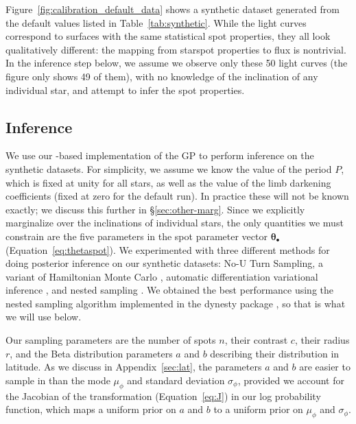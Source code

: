 \documentclass[modern,linenumbers]{aastex62}
\begin{document}
\vfill
\pagebreak

Figure~\ref{fig:calibration_default_data} shows a synthetic dataset generated
from the default values listed in Table~\ref{tab:synthetic}. While the
light curves correspond to surfaces with the same statistical spot properties,
they all look qualitatively different: the mapping from starspot properties
to flux is nontrivial. In the inference step below, we assume we observe
only these 50 light curves (the figure only shows 49 of them),
with no knowledge of the inclination of any individual
star, and attempt to infer the spot properties.

\subsection{Inference}
\label{sec:calibration-inference}
We use our \Python-based implementation of the GP \citep{JOSSPaper}
to perform inference on the synthetic datasets. For simplicity, we assume we
know the value of the period $P$, which is fixed at unity for all stars, as well
as the value of the limb darkening coefficients (fixed at zero for the default
run). In practice these will not be known exactly; we discuss this further in
\S\ref{sec:other-marg}. Since we explicitly marginalize over the inclinations
of individual stars, the only quantities we must constrain are the five
parameters in the spot parameter vector $\pmb{\theta}_\bullet$
(Equation~\ref{eq:thetaspot}). We experimented with three different methods
for doing posterior inference on our synthetic datasets: No-U Turn Sampling,
a variant of Hamiltonian Monte Carlo
\citep[NUTS;][]{Duane1987,Hoffman2011}, automatic differentiation
variational inference \citep[ADVI;][]{Kucukelbir2016,Blei2016}, and nested sampling \citep{Skilling2004,Skilling2006}.
We obtained the best performance using the nested sampling algorithm
implemented in the \textsf{dynesty} package \citep{Speagle2020}, so that is what
we will use below.

Our sampling parameters are the number of spots $n$, their contrast $c$,
their radius $r$, and the Beta distribution parameters $a$ and $b$ describing their
distribution in latitude. As we discuss in Appendix~\ref{sec:lat},
the parameters $a$ and $b$ are easier to sample in than
the mode $\mu_\phi$ and standard deviation $\sigma_\phi$, provided we
account for the Jacobian of the transformation (Equation~\ref{eq:J})
in our log probability function, which maps a uniform prior on $a$ and $b$
to a uniform prior on $\mu_\phi$ and $\sigma_\phi$.
\end{document}
